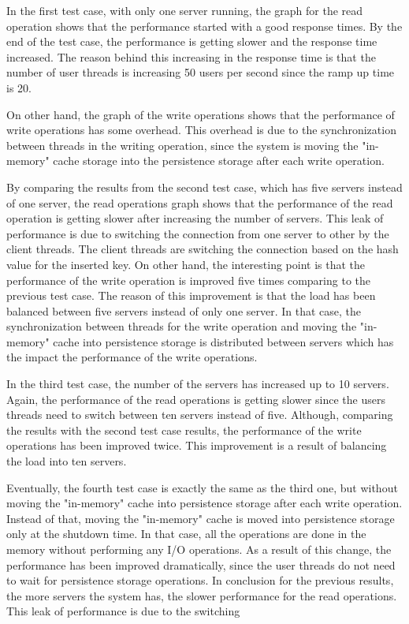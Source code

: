 \documentclass{sig-alternate}
\begin{document}
In the first test case, with only one server running, the graph for the read operation shows that the performance started with a good response times. By the end of the test case, the performance is getting slower and the response time increased. The reason behind this increasing in the response time is that the number of user threads is increasing 50 users per second since the ramp up time is 20.

On other hand, the graph of the write operations shows that the performance of write operations has some overhead. This overhead is due to the synchronization between threads in the writing operation, since the system is moving  the "in-memory" cache storage into the persistence storage after each write operation. 

By comparing the results from the second test case, which has five servers instead of one server, the read operations graph shows that the performance of the read operation is getting slower after increasing the number of servers. This leak of performance is due to switching the connection from one server to other by the client threads. The client threads are switching the connection based on the hash value for the inserted key. On other hand, the interesting point is that the performance of the write operation is improved five times comparing to the previous test case. The reason of this improvement is that the load has been balanced between five servers instead of only one server. In that case, the synchronization between threads for the write operation and moving the "in-memory" cache into persistence storage is distributed between servers which has the impact the performance of the write operations.

In the third test case, the number of the servers has increased up to 10 servers. Again, the performance of the read operations is getting slower since the users threads need to switch between ten servers instead of five. Although, comparing the results with the second test case results, the performance of the write operations has been improved twice.  This improvement  is a result of balancing the load into ten servers.

Eventually, the fourth test case is exactly the same as the third one, but without moving the "in-memory" cache into persistence storage after each write operation. Instead of that, moving the "in-memory" cache is moved into persistence storage only at the shutdown time. In that case, all the operations are done in the memory without performing any I/O operations. As a result of this change, the performance has been improved dramatically, since the user threads do not need to wait for persistence storage operations.
In conclusion for the previous results, the more servers the system has, the slower performance for the read operations. This leak of performance is due to the switching 
\end{document}

